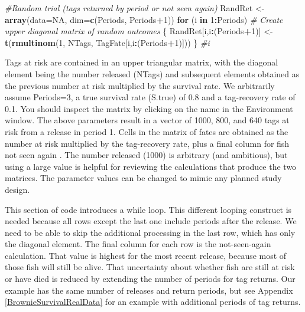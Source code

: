 \documentclass[
]{krantz}
\makeatletter
\newenvironment{Shaded}{\begin{snugshade}}{\end{snugshade}}
\newcommand{\AttributeTok}[1]{\textcolor[rgb]{0.27,0.27,0.27}{#1}}
\newcommand{\CommentTok}[1]{\textcolor[rgb]{0.37,0.37,0.37}{\textit{#1}}}
\newcommand{\ConstantTok}[1]{\textcolor[rgb]{0.37,0.37,0.37}{#1}}
\newcommand{\ControlFlowTok}[1]{\textcolor[rgb]{0.27,0.27,0.27}{\textbf{#1}}}
\newcommand{\DecValTok}[1]{\textcolor[rgb]{0.06,0.06,0.06}{#1}}
\newcommand{\FunctionTok}[1]{\textcolor[rgb]{0.27,0.27,0.27}{\textbf{#1}}}
\newcommand{\NormalTok}[1]{#1}
\newcommand{\OtherTok}[1]{\textcolor[rgb]{0.37,0.37,0.37}{#1}}
\newcommand{\SpecialCharTok}[1]{\textcolor[rgb]{0.43,0.43,0.43}{\textbf{#1}}}
\newenvironment{kframe}{%
\medskip{}
\setlength{\fboxsep}{.8em}
 \def\at@end@of@kframe{}%
 \ifinner\ifhmode%
  \def\at@end@of@kframe{\end{minipage}}%
  \begin{minipage}{\columnwidth}%
 \fi\fi%
 \def\FrameCommand##1{\hskip\@totalleftmargin \hskip-\fboxsep
 \colorbox{shadecolor}{##1}\hskip-\fboxsep
     \hskip-\linewidth \hskip-\@totalleftmargin \hskip\columnwidth}%
 \MakeFramed {\advance\hsize-\width
   \@totalleftmargin\z@ \linewidth\hsize
   \@setminipage}}%
 {\par\unskip\endMakeFramed%
 \at@end@of@kframe}
\renewenvironment{Shaded}{\begin{kframe}}{\end{kframe}}
\makeatother
\begin{document}
\begin{Shaded}
\begin{Highlighting}[]
\CommentTok{\#Random trial (tags returned by period or not seen again)}
\NormalTok{RandRet }\OtherTok{\textless{}{-}} \FunctionTok{array}\NormalTok{(}\AttributeTok{data=}\ConstantTok{NA}\NormalTok{, }\AttributeTok{dim=}\FunctionTok{c}\NormalTok{(Periods, Periods}\SpecialCharTok{+}\DecValTok{1}\NormalTok{))}
  \ControlFlowTok{for}\NormalTok{ (i }\ControlFlowTok{in} \DecValTok{1}\SpecialCharTok{:}\NormalTok{Periods) }\CommentTok{\# Create upper diagonal matrix of random outcomes}
\NormalTok{  \{}
\NormalTok{    RandRet[i,i}\SpecialCharTok{:}\NormalTok{(Periods}\SpecialCharTok{+}\DecValTok{1}\NormalTok{)] }\OtherTok{\textless{}{-}} \FunctionTok{t}\NormalTok{(}\FunctionTok{rmultinom}\NormalTok{(}\DecValTok{1}\NormalTok{, NTags, }
\NormalTok{                                            TagFate[i,i}\SpecialCharTok{:}\NormalTok{(Periods}\SpecialCharTok{+}\DecValTok{1}\NormalTok{)]))}
\NormalTok{  \} }\CommentTok{\#i}
\end{Highlighting}
\end{Shaded}

Tags at risk are contained in an upper triangular matrix, with the diagonal element being the number released (NTags) and subsequent elements obtained as the previous number at risk multiplied by the survival rate. We arbitrarily assume Periods=3, a true survival rate (S.true) of 0.8 and a tag-recovery rate of 0.1. You should inspect the matrix by clicking on the name in the Environment window. The above parameters result in a vector of 1000, 800, and 640 tags at risk from a release in period 1. Cells in the matrix of fates are obtained as the number at risk multiplied by the tag-recovery rate, plus a final column for fish not seen again \citep{williams.etal_2002}. The number released (1000) is arbitrary (and ambitious), but using a large value is helpful for reviewing the calculations that produce the two matrices. The parameter values can be changed to mimic any planned study design.

This section of code introduces a while loop. This different looping construct is needed because all rows except the last one include periods after the release. We need to be able to skip the additional processing in the last row, which has only the diagonal element. The final column for each row is the not-seen-again calculation. That value is highest for the most recent release, because most of those fish will still be alive. That uncertainty about whether fish are still at risk or have died is reduced by extending the number of periods for tag returns. Our example has the same number of releases and return periods, but see Appendix \ref{BrownieSurvivalRealData} for an example with additional periods of tag returns.
\end{document}
